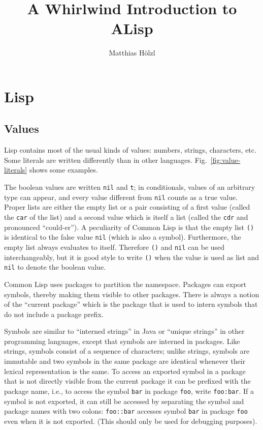 \documentclass[a4paper]{amsart}
\begin{document}
\title{A Whirlwind Introduction to ALisp}
\author{Matthias H\"olzl}

\maketitle

\section{Lisp}
\label{sec:lisp}


\subsection{Values}
\label{sec:values}

Lisp contains most of the usual kinds of values: numbers, strings,
characters, etc.  Some literals are written differently than in other
languages.  Fig.~\ref{fig:value-literals} shows some examples.

The boolean values are written \texttt{nil} and \texttt{t}; in
conditionals, values of an arbitrary type can appear, and every value
different from \texttt{nil} counts as a true value.  Proper lists are
either the empty list or a pair consisting of a first value (called
the \texttt{car} of the list) and a second value which is itself a
list (called the \texttt{cdr} and pronounced ``could-er'').  A
peculiarity of Common Lisp is that the empty list \texttt{()} is
identical to the false value \texttt{nil} (which is also a symbol).
Furthermore, the empty list always evaluates to itself.  Therefore
\texttt{()} and \texttt{nil} can be used interchangeably, but it is
good style to write \texttt{()} when the value is used as list and
\texttt{nil} to denote the boolean value.

Common Lisp uses packages to partition the namespace.  Packages can
export symbols, thereby making them visible to other packages.  There
is always a notion of the ``current package'' which is the package
that is used to intern symbols that do not include a package prefix.

Symbols are similar to ``interned strings'' in Java or ``unique
strings'' in other programming languages, except that symbols are
interned in packages. Like strings, symbols consist of a sequence of
characters; unlike strings, symbols are immutable and two symbols in
the same package are identical whenever their lexical representation
is the same.  To access an exported symbol in a package that is not
directly visible from the current package it can be prefixed with the
package name, i.e., to access the symbol \texttt{bar} in package
\texttt{foo}, write \texttt{foo:bar}.  If a symbol is not exported, it
can still be accessed by separating the symbol and package names with
two colons: \texttt{foo::bar} accesses symbol \texttt{bar} in package
\texttt{foo} even when it is not exported.  (This should only be used
for debugging purposes).
\end{document}
